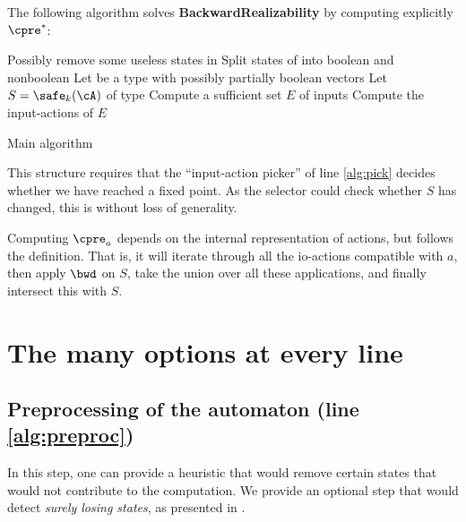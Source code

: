 \documentclass[sigconf,screen,nonacm]{acmart}
\begin{document}
The following algorithm solves \textbf{BackwardRealizability} by computing
explicitly \(\cpre^*\):
\begin{algorithm}
  \LinesNumbered
{}

\BlankLine

Possibly remove some useless states in \cA\;\label{alg:preproc}
Split states of \cA into boolean and nonboolean\;\label{alg:bool}
Let \Downset be a type with possibly partially boolean vectors\;\label{alg:types}
Let \(S = \safe_k(\cA)\) of type \Downset\;
Compute a sufficient set \(E\) of  inputs\;\label{alg:inputs}
Compute the input-actions of \(E\)\;\label{alg:actions}
\caption{Main algorithm}\label{main_algo}
\end{algorithm}

This structure requires that the ``input-action picker'' of line \ref{alg:pick}
decides whether we have reached a fixed point.  As the selector could check
whether \(S\) has changed, this is without loss of generality.

Computing \(\cpre_a\) depends on the internal representation of actions, but
follows the definition.  That is, it will iterate through all the io-actions
compatible with \(a\), then apply \(\bwd\) on \(S\), take the union over all these
applications, and finally intersect this with \(S\).

\section{The many options at every line}

\subsection{Preprocessing of the automaton (line \ref{alg:preproc})}

In this step, one can provide a heuristic that would remove certain states that
would not contribute to the computation.  We provide an optional step that would
detect \emph{surely losing states}, as presented in \cite{...}.
\end{document}
